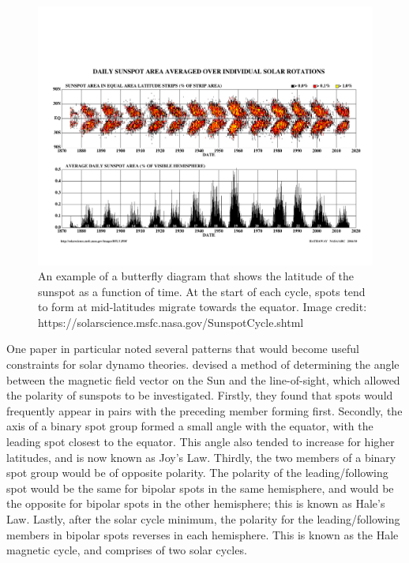 \begin{figure}
    \centering
    \includegraphics[scale=0.5]{Figures/1-Introduction/butterfly_diagram_crop.pdf}
    \caption[Butterfly diagram showing the latitudes of sunspots over a solar cycle]{An example of a butterfly diagram that shows the latitude of the sunspot as a function of time. At the start of each cycle, spots tend to form at mid-latitudes migrate towards the equator. Image credit: https://solarscience.msfc.nasa.gov/SunspotCycle.shtml}
    \label{fig:butterfly_diagram}
\end{figure}

One paper in particular noted several patterns that would become useful constraints for solar dynamo theories. \citet{Hale_etal_1919} devised a method of determining the angle between the magnetic field vector on the Sun and the line-of-sight, which allowed the polarity of sunspots to be investigated. Firstly, they found that spots would frequently appear in pairs with the preceding member forming first. Secondly, the axis of a binary spot group formed a small angle with the equator, with the leading spot closest to the equator. This angle also tended to increase for higher latitudes, and is now known as Joy's Law. Thirdly, the two members of a binary spot group would be of opposite polarity. The polarity of the leading/following spot would be the same for bipolar spots in the same hemisphere, and would be the opposite for bipolar spots in the other hemisphere; this is known as Hale's Law. Lastly, after the solar cycle minimum, the polarity for the leading/following members in bipolar spots reverses in each hemisphere. This is known as the Hale magnetic cycle, and comprises of two solar cycles.

